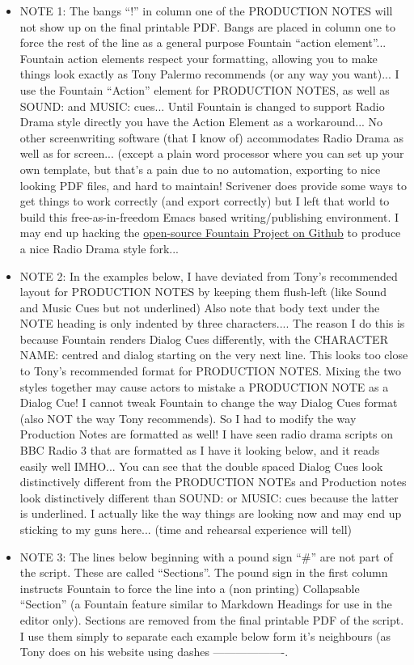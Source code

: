 \documentclass[openleft,oneside,showtrims]{memoir}
\begin{document}
\begin{itemize}
\item NOTE 1:  The bangs ``!'' in column one of the PRODUCTION NOTES will not show up on the final printable PDF.  Bangs are placed in column one to force the rest of the line as a general purpose Fountain ``action element''... Fountain action elements respect your formatting, allowing you to make things look exactly as Tony Palermo recommends (or any way you want)... I use the Fountain ``Action'' element for PRODUCTION NOTES, as well as SOUND: and MUSIC: cues... Until Fountain is changed to support Radio Drama style directly you have the Action Element as a workaround... No other screenwriting software (that I know of) accommodates Radio Drama as well as for screen... (except a plain word processor where you can set up your own template, but that's a pain due to no automation, exporting to nice looking PDF files, and hard to maintain! Scrivener does provide some ways to get things to work correctly (and export correctly) but I left that world to build this free-as-in-freedom Emacs based writing/publishing environment.  I may end up hacking the \href{https://github.com/nyousefi/Fountain}{open-source Fountain Project on Github} to produce a nice Radio Drama style fork...

\item NOTE 2:  In the examples below, I have deviated from Tony's recommended layout for PRODUCTION NOTES by keeping them flush-left (like Sound and Music Cues but not underlined) Also note that body text under the NOTE heading is only indented by three characters....  The reason I do this is because Fountain renders Dialog Cues differently, with the CHARACTER NAME: centred and dialog starting on the very next line.  This looks too close to Tony's recommended format for PRODUCTION NOTES.  Mixing the two styles together may cause actors to mistake a PRODUCTION NOTE as a Dialog Cue!  I cannot tweak Fountain to change the way Dialog Cues format (also NOT the way Tony recommends). So I had to modify the way Production Notes are formatted as well!  I have seen radio drama scripts on BBC Radio 3 that are formatted as I have it looking below, and it reads easily well IMHO... You can see that the double spaced Dialog Cues look distinctively different from the PRODUCTION NOTEs and Production notes look distinctively different than SOUND: or MUSIC: cues because the latter is underlined. I actually like the way things are looking now and may end up sticking to my guns here... (time and rehearsal experience will tell)

\item NOTE 3: The lines below beginning with a pound sign ``\#'' are not part of the script. These are called ``Sections''.  The pound sign in the first column instructs Fountain to force the line into a (non printing) Collapsable ``Section'' (a Fountain feature similar to Markdown Headings for use in the editor only). Sections are removed from the final printable PDF of the script. I use them simply to separate each example below form it's neighbours (as Tony does on his website using dashes -------------------.
\end{itemize}
\end{document}
